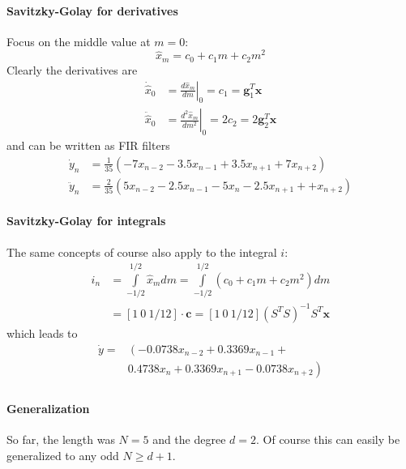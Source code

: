 \paragraph{Savitzky-Golay for derivatives}
Focus on the middle value at $m=0$:
\begin{equation*}
	\hat{x}_m = c_0 + c_1 m + c_2 m^2
\end{equation*}
Clearly the derivatives are
\begin{align*}
	\dot{\hat{x}}_0 &=  \left.\frac{d\hat{x}_m}{dm}\right|_0 = c_1 = \mathbf{g}_1^T\mathbf{x} \\
	\ddot{\hat{x}}_0 &= \left.\frac{d^2\hat{x}_m}{dm^2}\right|_0 = 2 c_2 = 2 \mathbf{g}_2^T\mathbf{x}
\end{align*}
and can be written as FIR filters
\begin{align*}
	\dot{y}_n &= \frac{1}{35} \left( -7 x_{n-2} - 3.5 x_{n-1} + 3.5 x_{n+1} + 7 x_{n+2}\right) \\
	\ddot{y}_n &= \frac{2}{35} \left( 5 x_{n-2} - 2.5 x_{n-1} - 5 x_n - 2.5 x_{n+1} + + x_{n+2}\right)
\end{align*}

\paragraph{Savitzky-Golay for integrals}
The same concepts of course also apply to  the integral $i$:
\begin{align*}
	i_n &= \int\limits_{-1/2}^{1/2} \hat{x}_m dm = \int\limits_{-1/2}^{1/2} (c_0 + c_1 m + c_2 m^2) dm \\
	&= \left[1 \: 0 \: 1/12 \right] \cdot \mathbf{c} = \left[1 \: 0 \: 1/12 \right] \left(S^T S \right)^{-1} S^T \mathbf{x}
\end{align*}
which leads to
\begin{align*}
	\dot{y} = & \left(-0.0738 x_{n-2} + 0.3369 x_{n-1} + \right. \\ 
	& \left. 0.4738 x_n + 0.3369 x_{n+1} - 0.0738 x_{n+2}  \right) \\
\end{align*}

\paragraph{Generalization}
So far, the length was $N=5$ and the degree $d=2$. Of course this can easily be 
generalized to any odd $N \geq d+1$. 